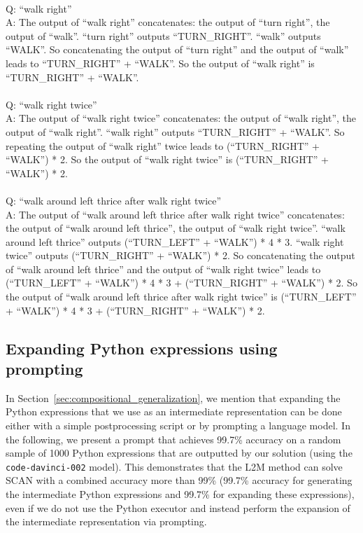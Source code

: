 {\\
Q: ``walk right'' \\
A: The output of ``walk right'' concatenates: the output of ``turn right'', the output of ``walk''. ``turn right'' outputs ``TURN\_RIGHT''. ``walk'' outputs ``WALK''. So concatenating the output of ``turn right'' and the output of ``walk'' leads to ``TURN\_RIGHT'' + ``WALK''. So the output of ``walk right'' is ``TURN\_RIGHT'' + ``WALK''. \\
\\
Q: ``walk right twice'' \\
A: The output of ``walk right twice'' concatenates: the output of ``walk right'', the output of ``walk right''. ``walk right'' outputs ``TURN\_RIGHT'' + ``WALK''. So repeating the output of ``walk right'' twice leads to (``TURN\_RIGHT'' + ``WALK'') * 2. So the output of ``walk right twice'' is (``TURN\_RIGHT'' + ``WALK'') * 2. \\
\\
Q: ``walk around left thrice after walk right twice'' \\
A: The output of ``walk around left thrice after walk right twice'' concatenates: the output of ``walk around left thrice'', the output of ``walk right twice''. ``walk around left thrice'' outputs (``TURN\_LEFT'' + ``WALK'') * 4 * 3. ``walk right twice'' outputs (``TURN\_RIGHT'' + ``WALK'') * 2. So concatenating the output of ``walk around left thrice'' and the output of ``walk right twice'' leads to (``TURN\_LEFT'' + ``WALK'') * 4 * 3 + (``TURN\_RIGHT'' + ``WALK'') * 2. So the output of ``walk around left thrice after walk right twice'' is (``TURN\_LEFT'' + ``WALK'') * 4 * 3 + (``TURN\_RIGHT'' + ``WALK'') * 2.
}


\subsection{Expanding Python expressions using prompting}
\label{app:scan_expanding_expressions}

In Section~\ref{sec:compositional_generalization}, we mention that expanding the Python expressions that we use as an intermediate representation can be done either with a simple postprocessing script or by prompting a language model. In the following, we present a prompt that achieves 99.7\% accuracy on a random sample of 1000 Python expressions that are outputted by our solution (using the \texttt{code-davinci-002} model). This demonstrates that the L2M method can solve SCAN with a combined accuracy more than 99\% (99.7\% accuracy for generating the intermediate Python expressions and 99.7\% for expanding these expressions), even if we do not use the Python executor and instead perform the expansion of the intermediate representation via prompting.

